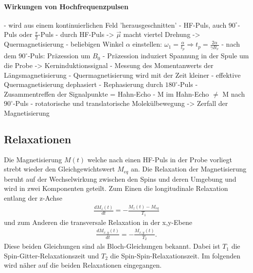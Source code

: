 \paragraph{Wirkungen von Hochfrequenzpulsen}
- wird aus einem kontinuierlichen Feld 'herausgeschnitten'
- HF-Puls, auch $90^{\circ}$-Puls oder $\frac{\pi}{2}$-Puls
- durch HF-Puls -> $\overrightarrow{\mu}$ macht viertel Drehung -> Quermagnetisierung
- beliebigen Winkel $\alpha$ einstellen: $\omega_1 = \frac{\alpha}{t_p} \Rightarrow t_p = \frac{2 \alpha}{\gamma B_x}$
- nach dem $90^{\circ}$-Puls: Pr\"{a}zession um $B_0$
- Pr\"{a}zession induziert Spannung in der Spule um die Probe -> Kerninduktionssignal
- Messung des Momentanwerts der L\"{a}ngsmagnetisierung
- Quermagnetisierung wird mit der Zeit kleiner
- effektive Quermagnetisierung dephasiert
- Rephasierung durch $180^{\circ}$-Puls
- Zusammentreffen der Signalpunkte = Hahn-Echo
- M im Hahn-Echo $\neq$ M nach $90^{\circ}$-Puls
- rotatorische und translatorische Molek\"{u}lbewegung -> Zerfall der Magnetisierung


\subsection{Relaxationen}
Die Magnetisierung $M(t)$ welche nach einen HF-Puls in der Probe vorliegt strebt wieder den Gleichgewichtswert $M_{eq}$ an.
Die Relaxation der Magnetisierung beruht auf der Wechselwirkung zwischen den Spins und deren Umgebung und wird in zwei Komponenten geteilt.
Zum Einen die longitudinale Relaxation entlang der z-Achse
\begin{align}
	\frac{d M_z(t)}{d t} = - \frac{M_z(t) - M_{eq}}{T_1}
\end{align}
und zum Anderen die transversale Relaxation in der x,y-Ebene
\begin{align}
	\frac{d M_{x,y}(t)}{d t} = - \frac{M_{x,y}(t)}{T_2} .
\end{align}
Diese beiden Gleichungen sind als Bloch-Gleichungen bekannt.
Dabei ist $T_1$ die Spin-Gitter-Relaxationszeit und $T_2$ die Spin-Spin-Relaxationszeit.
Im folgenden wird n\"{a}her auf die beiden Relaxationen eingegangen.

